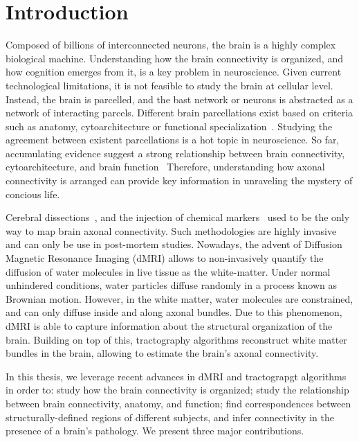 \chapter{Introduction}

Composed of billions of interconnected neurons, the brain is a highly complex
biological machine. Understanding how the brain connectivity is organized,
and how cognition emerges from it, is a key problem in neuroscience. Given
current technological limitations, it is not feasible to study the brain at
cellular level. Instead, the brain is parcelled, and the bast network or neurons
is abstracted as a network of interacting parcels. Different brain parcellations
exist based on criteria such as anatomy, cytoarchitecture or functional
specialization~\cite{Brodmann1909, Collins1998, Yeo2011}. Studying the
agreement between existent parcellations is a hot topic in neuroscience.
So far, accumulating evidence suggest a strong relationship between brain
connectivity, cytoarchitecture, and brain function~\citep{Passingham2002, Johansen-Berg2004, Honey2009, Eickhoff2010}
Therefore, understanding how axonal connectivity is arranged can provide key
information in unraveling the mystery of concious life.

Cerebral dissections~\cite{Meynert1872, Brodmann1909, Gray1918},
and the injection of chemical markers~\cite{Schmahmann2006, Stephan2013} used to
be the only way to map brain axonal connectivity. Such methodologies are highly
invasive and can only be use in post-mortem studies. Nowadays, the advent of
Diffusion Magnetic Resonance Imaging (dMRI) allows to non-invasively quantify
the diffusion of water molecules in live tissue as the white-matter. Under
normal unhindered conditions, water particles diffuse randomly in a process
known as Brownian motion. However, in the white matter, water molecules are
constrained, and can only diffuse inside and along axonal bundles. Due to this
phenomenon, dMRI is able to capture information about the structural organization
of the brain. Building on top of this, tractography algorithms reconstruct
white matter bundles in the brain, allowing to estimate the brain's axonal
connectivity.

In this thesis, we leverage recent advances in dMRI and tractograpgt algorithms
in order to: study how the brain connectivity is organized; study the relationship
between brain connectivity, anatomy, and function; find correspondences between 
structurally-defined regions of different subjects, and infer connectivity in
the presence of a brain’s pathology. We present three major contributions.

